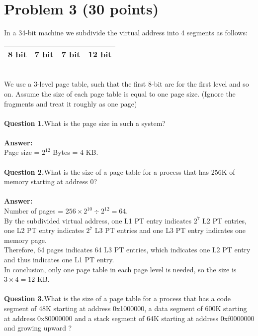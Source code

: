 \documentclass[answers]{exam}
\begin{document}
\vspace{12mm}

\section*{Problem 3 (30 points)}
In a 34-bit machine we subdivide the virtual address into 4 segments as follows:\\
\begin{table}[h!]
  \begin{center}
  \setlength{\tabcolsep}{7mm}
    \begin{tabular}{|c|c|c|c|} 
      \hline
      8 bit &	7 bit &	7 bit &	12 bit\\
      \hline
    \end{tabular}
  \end{center}
\end{table}
\\We use a 3-level page table, such that the first 8-bit are for the first level and so on. Assume the size of each page table is equal to one page size. (Ignore the fragments and treat it roughly as one page)
\\
\\\textbf{Question 1.}What is the page size in such a system? 
\\
\\
\textbf{Answer:}\\
Page size = $2^{12}$ Bytes = 4 KB.
\\
\\\textbf{Question 2.}What is the size of a page table for a process that has 256K of memory starting at address 0? 
\\
\\
\textbf{Answer:}\\
Number of pages = $ 256\times 2^{10} \div 2^{12}=64$.\\
By the subdivided virtual address, one L1 PT entry indicates $2^7$ L2 PT entries, one L2 PT entry indicates $2^7$ L3 PT entries and one L3 PT entry indicates one memory page.\\
Therefore, 64 pages indicates 64 L3 PT entries, which indicates one L2 PT entry and thus indicates one L1 PT entry.\\
In conclusion, only one page table in each page level is needed, so the size is $3\times 4=12$ KB.
\\
\\\textbf{Question 3.}What is the size of a page table for a process that has a code segment of 48K starting at address 0x1000000, a data segment of 600K starting at address 0x80000000 and a stack segment of 64K starting at address 0xf0000000 and growing upward ?\\
\end{document}
